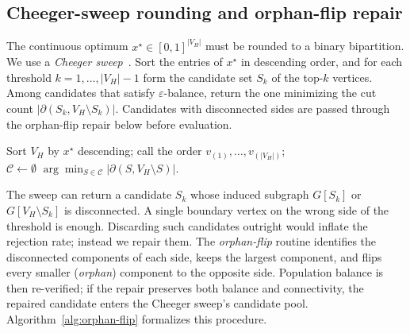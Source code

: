 \documentclass[11pt]{article}
\begin{document}
\subsection{Cheeger-sweep rounding and orphan-flip repair}\label{sec:rounding}

The continuous optimum $x^\star \in [0,1]^{|V_H|}$ must be rounded to a
binary bipartition. We use a \emph{Cheeger sweep}~\cite{chung1997spectral}. Sort the entries of $x^\star$ in descending order, and for each
threshold $k = 1, \ldots, |V_H| - 1$ form the candidate set $S_k$ of the
top-$k$ vertices. Among candidates that satisfy $\varepsilon$-balance,
return the one minimizing the cut count
$|\partial(S_k, V_H \setminus S_k)|$. Candidates with disconnected sides
are passed through the orphan-flip repair below before evaluation.

\begin{algorithm}[H]
\caption{Cheeger-sweep rounding with orphan-flip repair}\label{alg:cheeger-sweep}
Sort $V_H$ by $x^\star$ descending; call the order $v_{(1)}, \ldots, v_{(|V_H|)}$;\\
$\mathcal{C} \gets \emptyset$ 
\Return $\arg\min_{S \in \mathcal{C}} |\partial(S, V_H \setminus S)|$.
\end{algorithm}

The sweep can return a candidate $S_k$ whose induced subgraph $G[S_k]$
or $G[V_H \setminus S_k]$ is disconnected. A single boundary vertex
on the wrong side of the threshold is enough. Discarding such
candidates outright would inflate the rejection rate; instead we repair
them. The \emph{orphan-flip} routine identifies the disconnected
components of each side, keeps the largest component, and flips every
smaller (\emph{orphan}) component to the opposite side. Population
balance is then re-verified; if the repair preserves both balance and
connectivity, the repaired candidate enters the Cheeger sweep's
candidate pool. Algorithm~\ref{alg:orphan-flip} formalizes this procedure.
\end{document}
